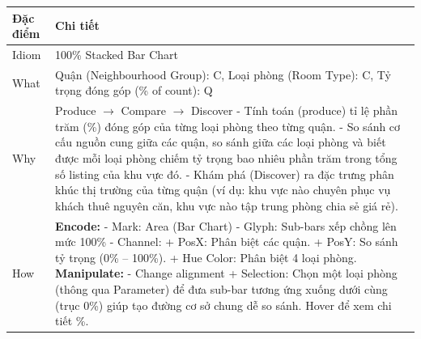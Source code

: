 \begin{longtable}{|p{2.8cm}|p{11.5cm}|}
\hline
\textbf{Đặc điểm} & \textbf{Chi tiết} \\
\hline
\endhead
\hline
\endfoot
Idiom & 100\% Stacked Bar Chart \\
\hline
What & Quận (Neighbourhood Group): C, Loại phòng (Room Type): C, Tỷ trọng đóng góp (\% of count): Q \\
\hline
Why & Produce $\rightarrow$ Compare $\rightarrow$ Discover \newline
\newline
- Tính toán (produce) tỉ lệ phần trăm (\%) đóng góp của từng loại phòng theo từng quận. \newline
\newline
- So sánh cơ cấu nguồn cung giữa các quận, so sánh giữa các loại phòng và biết được mỗi loại phòng chiếm tỷ trọng bao nhiêu phần trăm trong tổng số listing của khu vực đó. \newline
\newline
- Khám phá (Discover) ra đặc trưng phân khúc thị trường của từng quận (ví dụ: khu vực nào chuyên phục vụ khách thuê nguyên căn, khu vực nào tập trung phòng chia sẻ giá rẻ). \\
\hline
How & \textbf{Encode:} \newline
\newline
- Mark: Area (Bar Chart) \newline
\newline
- Glyph: Sub-bars xếp chồng lên mức 100\% \newline
\newline
- Channel: \newline
\newline
\hspace{0.3cm} + PosX: Phân biệt các quận. \newline
\newline
\hspace{0.3cm} + PosY: So sánh tỷ trọng (0\% -- 100\%). \newline
\newline
\hspace{0.3cm} + Hue Color: Phân biệt 4 loại phòng. \newline
\newline
\textbf{Manipulate:} \newline
\newline
- Change alignment + Selection: Chọn một loại phòng (thông qua Parameter) để đưa sub-bar tương ứng xuống dưới cùng (trục 0\%) giúp tạo đường cơ sở chung dễ so sánh. Hover để xem chi tiết \%. \newline

\end{longtable}
